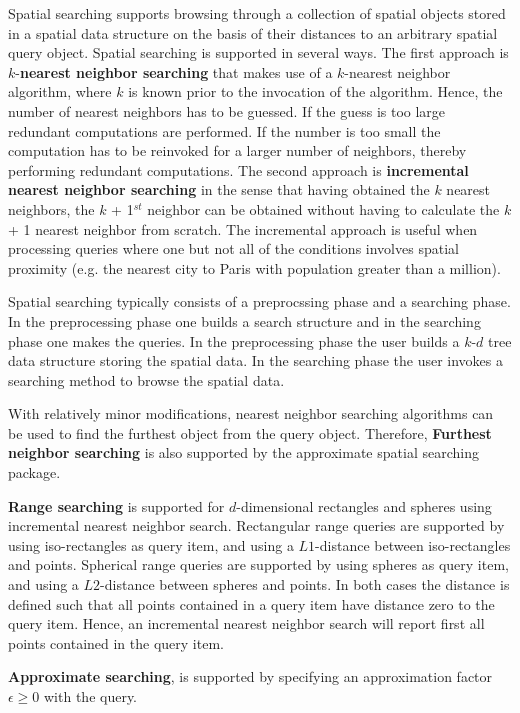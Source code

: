Spatial searching supports browsing through a collection of spatial objects
stored in a spatial data structure on the basis of their distances to an arbitrary spatial
query object.
Spatial searching is supported in several ways. 
The first approach is $k$-{\bf nearest neighbor searching} that makes use of a $k$-nearest neighbor
algorithm, where $k$ is known prior to the invocation of the algorithm.
Hence, the number of nearest neighbors has to be
guessed. If the guess is too large redundant computations are performed.
If the number is too small the computation has to be  
reinvoked for a larger number of neighbors, thereby performing redundant computations.
The second approach is {\bf incremental nearest neighbor searching} in the sense that having obtained
the $k$ nearest neighbors, the $k$ + 1$^{st}$ neighbor can be obtained without
having to calculate the $k$ + 1 nearest neighbor from scratch.
The incremental approach is useful when processing queries where
one but not all of the conditions involves spatial proximity (e.g. the nearest city to Paris with
population greater than a million).

Spatial searching typically consists of a preprocssing phase and a searching phase. 
In the preprocessing phase one builds a search structure 
and in the searching phase 
one makes the queries. 
In the preprocessing phase the user builds a $k$-$d$ tree data structure storing the spatial data.
In the searching phase the user invokes a searching method to browse the spatial data.

With relatively minor modifications, nearest neighbor searching algorithms can be
used to find the furthest object from the query object. 
Therefore, {\bf Furthest neighbor searching} is also supported
by the approximate spatial searching package.

{\bf Range searching}
is supported for $d$-dimensional rectangles and spheres using incremental nearest neighbor search. 
Rectangular range queries are supported by 
using iso-rectangles as query item, and using a $L1$-distance between iso-rectangles and points.
Spherical range queries are supported by using spheres as query item, and using a $L2$-distance
between spheres and points.
In both cases the distance is defined such that all points contained in a query item have distance zero
to the query item. Hence, an incremental nearest neighbor search will report first all points
contained in the query item.  

{\bf Approximate searching}, is supported by
specifying an approximation factor $\epsilon \geq 0$ with the query.


